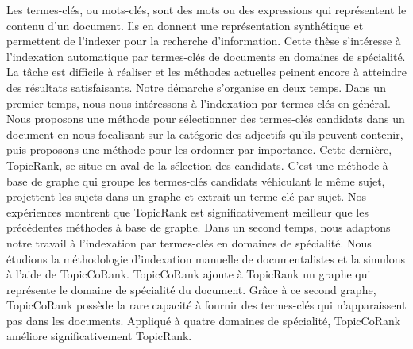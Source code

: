 Les termes-clés, ou mots-clés, sont des mots ou des expressions qui représentent
le contenu d'un document. Ils en donnent une représentation synthétique et
permettent de l'indexer pour la recherche d'information. Cette thèse s'intéresse
à l'indexation automatique par termes-clés de documents en domaines de
spécialité. La tâche est difficile à réaliser et les méthodes actuelles peinent
encore à atteindre des résultats satisfaisants. Notre démarche s'organise en
deux temps. Dans un premier temps, nous nous intéressons à l'indexation par
termes-clés en général. Nous proposons une méthode pour sélectionner des
termes-clés candidats dans un document en nous focalisant sur la catégorie des
adjectifs qu'ils peuvent contenir, puis proposons une méthode pour les ordonner
par importance. Cette dernière, TopicRank, se situe en aval de la sélection des
candidats. C'est une méthode à base de graphe qui groupe les termes-clés
candidats véhiculant le même sujet, projettent les sujets dans un graphe et
extrait un terme-clé par sujet. Nos expériences montrent que TopicRank est
significativement meilleur que les précédentes méthodes à base de graphe. Dans
un second temps, nous adaptons notre travail à l'indexation par termes-clés en
domaines de spécialité. Nous étudions la méthodologie d'indexation manuelle de
documentalistes et la simulons à l'aide de TopicCoRank. TopicCoRank ajoute à
TopicRank un graphe qui représente le domaine de spécialité du document. Grâce
à ce second graphe, TopicCoRank possède la rare capacité à fournir des
termes-clés qui n'apparaissent pas dans les documents. Appliqué à quatre
domaines de spécialité, TopicCoRank améliore significativement TopicRank.

